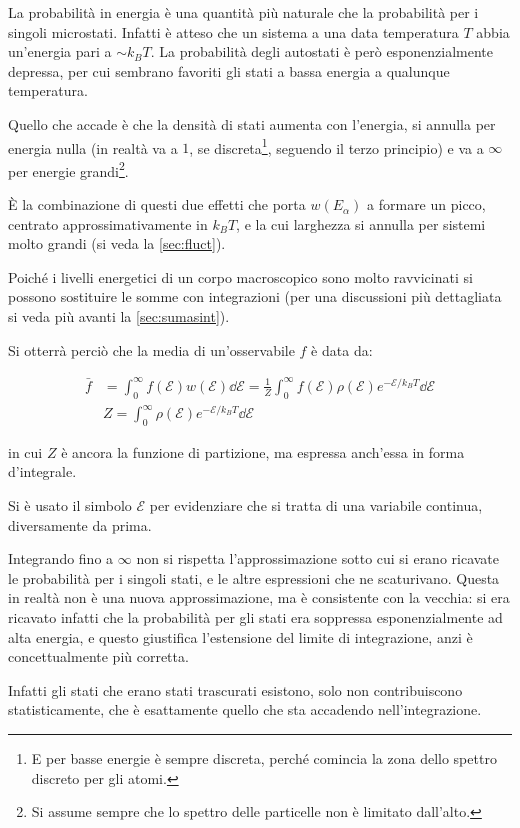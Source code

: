 \begin{oss}
	La probabilità in energia è una quantità più naturale che la probabilità per i singoli microstati. Infatti è atteso che un sistema a una data temperatura $T$ abbia un'energia pari a $\sim k_B T$. La probabilità degli autostati è però esponenzialmente depressa, per cui sembrano favoriti gli stati a bassa energia a qualunque temperatura.
	
	Quello che accade è che la densità di stati aumenta con l'energia,  si annulla per energia nulla (in realtà va a $1$, se discreta\footnote{E per basse energie è sempre discreta, perché comincia la zona dello spettro discreto per gli atomi.}, seguendo il terzo principio) e va a $\infty$ per energie grandi\footnote{Si assume sempre che lo spettro delle particelle non è limitato dall'alto.}. 
	
	\`E la combinazione di questi due effetti che porta $w(E_\alpha)$ a formare un picco, centrato approssimativamente in $k_B T$, e la cui larghezza si annulla per sistemi molto grandi (si veda la \cref{sec:fluct}).
\end{oss}

Poiché i livelli energetici di un corpo macroscopico sono molto ravvicinati si possono sostituire le somme con integrazioni (per una discussioni più dettagliata si veda più avanti la \cref{sec:sumasint}).

Si otterrà perciò che la media di un'osservabile $f$ è data da:

\begin{align*}
\bar{f} &= \int_{0}^{\infty} f(\mathcal{E}) w(\mathcal{E})\dd \mathcal{E} = \frac{1}{Z} \int_{0}^{\infty} f(\mathcal{E}) \rho(\mathcal{E}) e^{-\mathcal{E}/k_B T}\dd \mathcal{E}\\
& Z = \int_{0}^{\infty} \rho(\mathcal{E}) e^{-\mathcal{E}/k_B T}\dd \mathcal{E}\
\end{align*}

\noindent in cui $Z$ è ancora la funzione di partizione, ma espressa anch'essa in forma d'integrale.

Si è usato il simbolo $\mathcal{E}$ per evidenziare che si tratta di una variabile continua, diversamente da prima.

\begin{note}
	Integrando fino a $\infty$ non si rispetta l'approssimazione sotto cui si erano ricavate le probabilità per i singoli stati, e le altre espressioni che ne scaturivano. Questa in realtà non è una nuova approssimazione, ma è consistente con la vecchia: si era ricavato infatti che la probabilità per gli stati era soppressa esponenzialmente ad alta energia, e questo giustifica l'estensione del limite di integrazione, anzi è concettualmente più corretta.
	
	Infatti gli stati che erano stati trascurati esistono, solo non contribuiscono statisticamente, che è esattamente quello che sta accadendo nell'integrazione.
\end{note}

